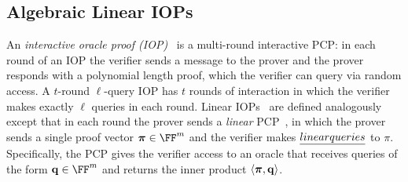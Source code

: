 \fi 


\subsection{Algebraic Linear IOPs} 

An \emph{interactive oracle proof (IOP)}~\cite{TCC:BenChiSpo16,STOC:ReiRotRot16} is a multi-round interactive PCP: in each round of an IOP the verifier sends a message to the prover and the prover responds with a polynomial length proof, which the verifier can query via random access. A $t$-round $\ell$-query IOP has $t$ rounds of interaction in which the verifier makes exactly $\ell$ queries in each round. Linear IOPs~\cite{C:BBCGI19} are defined analogously except that in each round the prover sends a \emph{linear} PCP~\cite{CC:IKO07}, in which the prover sends a single proof vector $\proofO \in \FF^m$ %
and the verifier makes $\emph{linear queries}$ to $\pi$. Specifically, the PCP gives the verifier access to an oracle that receives queries of the form $\mathbf{q} \in \FF^m$ and returns the inner product $\langle \boldsymbol{\pi}, \mathbf{q} \rangle$. 


